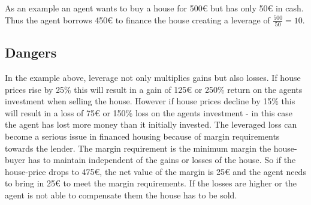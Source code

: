 \documentclass[../Bachelorarbeit.tex]{subfiles}
\begin{document}
\medskip

As an example an agent wants to buy a house for 500\euro{} but has only 50\euro{} in cash. Thus the agent borrows 450\euro{} to finance the house creating a leverage of $\frac{500}{50} = 10$.

\subsection{Dangers}
In the example above, leverage not only multiplies gains but also losses. If house prices rise by 25\% this will result in a gain of 125\euro{} or 250\% return on the agents investment when selling the house. However if house prices decline by 15\% this will result in a loss of 75\euro{} or 150\% loss on the agents investment - in this case the agent has lost more money than it initially invested. The leveraged loss can become a serious issue in financed housing because of margin requirements towards the lender. The margin requirement is the minimum margin the house-buyer has to maintain independent of the gains or losses of the house. So if the house-price drops to 475\euro{}, the net value of the margin is 25\euro{} and the agent needs to bring in 25\euro{} to meet the margin requirements. If the losses are higher or the agent is not able to compensate them the house has to be sold.


\end{document}
